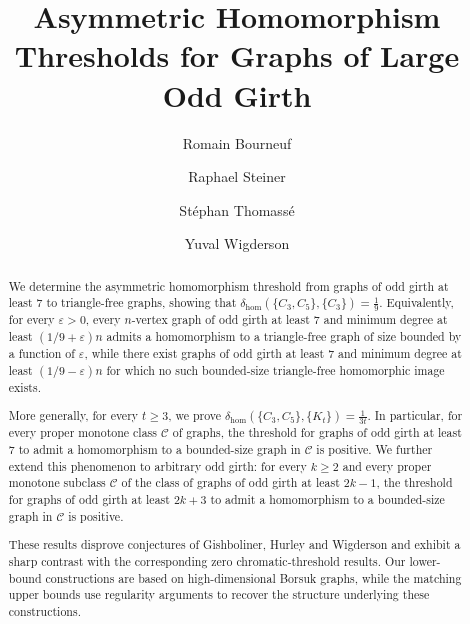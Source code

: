 \documentclass{article}
\newcommand*\samethanks[1][\value{footnote}]{\footnotemark[#1]}
\begin{document}
\title{Asymmetric Homomorphism Thresholds for Graphs of Large Odd Girth}
\author[1]{Romain Bourneuf\samethanks}
\author[2]{Raphael Steiner\samethanks}
\author[3]{Stéphan Thomassé\samethanks}
\author[4]{Yuval Wigderson\samethanks}


\maketitle

\begin{abstract}
We determine the asymmetric homomorphism threshold from graphs of odd girth at least $7$ to triangle-free graphs, showing that $\delta_{\mathrm{hom}}(\{C_3,C_5\},\{C_3\})=\frac{1}{9}$.
Equivalently, for every $\varepsilon>0$, every $n$-vertex graph of odd girth at least $7$ and minimum degree at least $(1/9+\varepsilon)n$ admits a homomorphism to a triangle-free graph of size bounded by a function of $\varepsilon$, while there exist graphs of odd girth at least $7$ and minimum degree at least $(1/9-\varepsilon)n$ for which no such bounded-size triangle-free homomorphic image exists.

More generally, for every $t\geq 3$, we prove $\delta_{\mathrm{hom}}(\{C_3,C_5\},\{K_t\})=\frac{1}{3t}$.
In particular, for every proper monotone class $\mathcal C$ of graphs, the threshold for graphs of odd girth at least $7$ to admit a homomorphism to a bounded-size graph in $\mathcal C$ is positive.
We further extend this phenomenon to arbitrary odd girth: for every $k\geq 2$ and every proper monotone subclass $\mathcal C$ of the class of graphs of odd girth at least $2k-1$, the threshold for graphs of odd girth at least $2k+3$ to admit a homomorphism to a bounded-size graph in $\mathcal C$ is positive.

These results disprove conjectures of Gishboliner, Hurley and Wigderson and exhibit a sharp contrast with the corresponding zero chromatic-threshold results. Our lower-bound constructions are based on high-dimensional Borsuk graphs, while the matching upper bounds use regularity arguments to recover the structure underlying these constructions.

\end{abstract}
\end{document}
